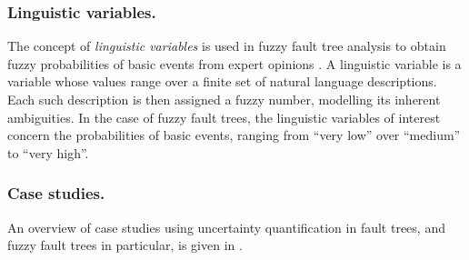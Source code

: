 \documentclass[runningheads]{llncs}
\renewcommand{\emph}[1]{{\it #1}}
\begin{document}
\subsubsection{Linguistic variables.} 
The concept of \emph{linguistic variables} is used in fuzzy fault tree analysis to obtain fuzzy probabilities of basic events from expert opinions \cite{bowles1995application,lin1997hybridFTA,pan2007assessing,yuhua2005estimation}. A linguistic variable is a variable whose values range over a finite set of natural language descriptions. Each such description is then assigned a fuzzy number, modelling its inherent ambiguities. In the case of fuzzy fault trees, the linguistic variables of interest concern the probabilities of basic events, ranging from ``very low'' over ``medium'' to ``very high''.

\subsubsection{Case studies.}
An overview of case studies using uncertainty quantification in fault trees, and fuzzy fault trees in particular, is given in \cite{yazdi2019uncertainty}.
















\end{document}
